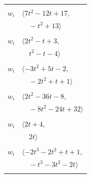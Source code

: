 \documentclass[11pt]{article}
\begin{document}
\begin{longtable}{@{}ll@{}}
\addlinespace[2pt]
\multicolumn{2}{@{}p{0.97\textwidth}@{}}{$i=13$, $D_i=1$, $\rho_{ij}$: $1{:}2, \allowbreak 6{:}2, \allowbreak 7{:}1, \allowbreak 20{:}2, \allowbreak 21{:}1, \allowbreak 25{:}2, \allowbreak 27{:}1, \allowbreak 29{:}2, \allowbreak 35{:}2$}\\
$w_i$ & $\langle 7t^{2}-12t+17,$\\
 & $\quad -t^{2}+13\rangle$\\
\addlinespace[2pt]
\multicolumn{2}{@{}p{0.97\textwidth}@{}}{$i=14$, $D_i=1$, $\rho_{ij}$: $1{:}2, \allowbreak 2{:}2, \allowbreak 22{:}2, \allowbreak 30{:}2$}\\
$w_i$ & $\langle 2t^{2}-t+3,$\\
 & $\quad t^{2}-t-4\rangle$\\
\addlinespace[2pt]
\multicolumn{2}{@{}p{0.97\textwidth}@{}}{$i=15$, $D_i=1$, $\rho_{ij}$: $2{:}2, \allowbreak 3{:}2, \allowbreak 17{:}1, \allowbreak 22{:}1, \allowbreak 23{:}1, \allowbreak 24{:}1$}\\
$w_i$ & $\langle -3t^{2}+5t-2,$\\
 & $\quad -2t^{2}+t+1\rangle$\\
\addlinespace[2pt]
\multicolumn{2}{@{}p{0.97\textwidth}@{}}{$i=16$, $D_i=1$, $\rho_{ij}$: $7{:}1, \allowbreak 19{:}1, \allowbreak 21{:}1, \allowbreak 23{:}2, \allowbreak 24{:}1, \allowbreak 30{:}1, \allowbreak 31{:}1, \allowbreak 34{:}2$}\\
$w_i$ & $\langle 2t^{2}-36t-8,$\\
 & $\quad -8t^{2}-24t+32\rangle$\\
\addlinespace[2pt]
\multicolumn{2}{@{}p{0.97\textwidth}@{}}{$i=17$, $D_i=1$, $\rho_{ij}$: $0{:}2, \allowbreak 2{:}2, \allowbreak 12{:}2, \allowbreak 15{:}2, \allowbreak 30{:}1$}\\
$w_i$ & $\langle 2t+4,$\\
 & $\quad 2t\rangle$\\
\addlinespace[2pt]
\multicolumn{2}{@{}p{0.97\textwidth}@{}}{$i=18$, $D_i=1$, $\rho_{ij}$: $11{:}1, \allowbreak 19{:}1, \allowbreak 24{:}2, \allowbreak 25{:}1, \allowbreak 29{:}2, \allowbreak 31{:}1$}\\
$w_i$ & $\langle -2t^{3}-2t^{2}+t+1,$\\
 & $\quad -t^{3}-3t^{2}-2t\rangle$\\
\addlinespace[2pt]
\multicolumn{2}{@{}p{0.97\textwidth}@{}}{$i=19$, $D_i=1$, $\rho_{ij}$: $2{:}1, \allowbreak 16{:}2, \allowbreak 18{:}2, \allowbreak 22{:}1, \allowbreak 28{:}1, \allowbreak 30{:}2, \allowbreak 32{:}1, \allowbreak 33{:}2$}\\

\end{longtable}
\end{document}
